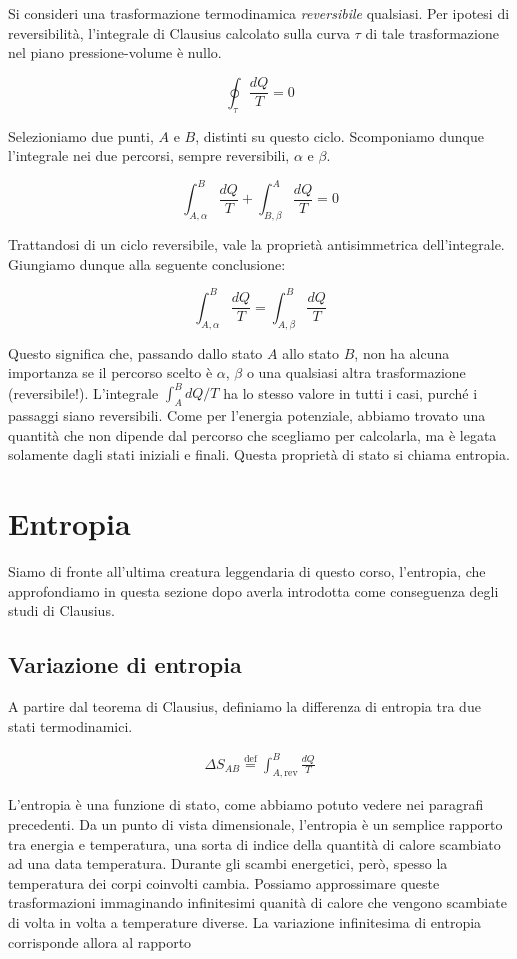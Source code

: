 Si consideri una trasformazione termodinamica \textit{reversibile} qualsiasi.
Per ipotesi di reversibilità, l'integrale di Clausius calcolato sulla curva $\tau$
di tale trasformazione nel piano pressione-volume è nullo.

\[ \oint_\tau \frac{dQ}{T} = 0 \]

\noindent Selezioniamo due punti, $A$ e $B$, distinti su questo ciclo. Scomponiamo
dunque l'integrale nei due percorsi, sempre reversibili, $\alpha$ e $\beta$.

\[ \int_{A,\alpha}^{B} \frac{dQ}{T} + \int_{B,\beta}^{A} \frac{dQ}{T} = 0 \]

\noindent Trattandosi di un ciclo reversibile, vale la proprietà antisimmetrica
dell'integrale. Giungiamo dunque alla seguente conclusione:

\[ \int_{A,\alpha}^{B} \frac{dQ}{T} = \int_{A,\beta}^{B} \frac{dQ}{T} \]

\noindent Questo significa che, passando dallo stato $A$ allo stato
$B$, non ha alcuna importanza se il percorso scelto è $\alpha$, $\beta$
o una qualsiasi altra trasformazione (reversibile!). L'integrale
$\int_{A}^{B}dQ/T$ ha lo stesso valore in tutti i casi, purché i
passaggi siano reversibili. Come per l'energia potenziale,
abbiamo trovato una quantità che non dipende dal percorso che
scegliamo per calcolarla, ma è legata solamente dagli stati
iniziali e finali. Questa proprietà di stato si chiama entropia.

\section{Entropia}
Siamo di fronte all'ultima creatura leggendaria di questo corso,
l'entropia, che approfondiamo in questa sezione dopo averla introdotta
come conseguenza degli studi di Clausius.

\subsection{Variazione di entropia}
A partire dal teorema di Clausius, definiamo la differenza di entropia
tra due stati termodinamici.

\begin{align}
    \Delta S_{AB} \stackrel{\text{def}}{=} \int_{A,\text{rev}}^{B} \frac{dQ}{T}\label{variaz_entropia}
\end{align}

L'entropia è una funzione di stato, come abbiamo
potuto vedere nei paragrafi precedenti. Da un punto di vista dimensionale, l'entropia
è un semplice rapporto tra energia e temperatura, una sorta di
indice della quantità di calore scambiato ad una data temperatura.
Durante gli scambi energetici, però, spesso la temperatura dei corpi
coinvolti cambia. Possiamo approssimare queste trasformazioni immaginando
infinitesimi quanità di calore che vengono scambiate di volta in volta
a temperature diverse. La variazione infinitesima di entropia corrisponde
allora al rapporto

